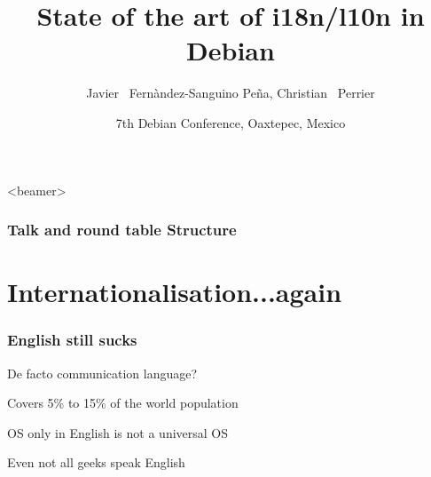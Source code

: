 \documentclass{beamer}
\title[State of the art of i18n/l10n in Debian] 
{State of the art of i18n/l10n in Debian}
\author[jfs, bubulle] 
{Javier ~Fernàndez-Sanguino Peña, Christian ~Perrier}
\date[Debconf 6] 
{7th Debian Conference, Oaxtepec, Mexico}
\begin{document}
\frame{\titlepage}

\begin{frame}<beamer>
    \frametitle{Talk and round table Structure}
    \tableofcontents[subsectionstyle=hide]
\end{frame}

\section{Internationalisation...again}


\begin{frame}
  \frametitle{English still sucks}
	\begin{block}
		{De facto communication language?}
	\end{block}
	\begin{block}
		{Covers 5\% to 15\% of the world population}
	\end{block}
	\begin{block}
		{OS only in English is not a universal OS}
	\end{block}
	\begin{block}
		{Even not all geeks speak English}
	\end{block}
\end{frame}
\end{document}
